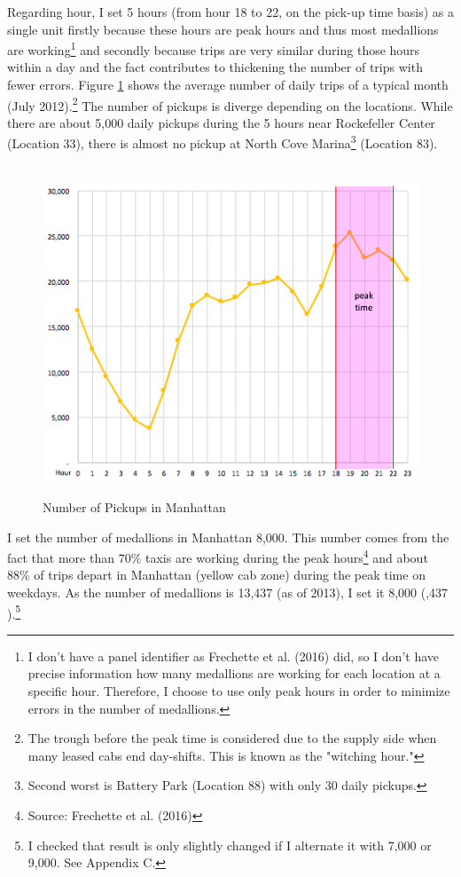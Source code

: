 \indent Regarding hour, I set 5 hours (from hour 18 to 22, on the pick-up time basis) as a single unit firstly because these hours are peak hours and thus most medallions are working\footnote{I don't have a panel identifier as Frechette et al. (2016) did, so I don't have precise information how many medallions are working for each location at a specific hour. Therefore, I choose to use only peak hours in order to minimize errors in the number of medallions.} and secondly because trips are very similar during those hours within a day and the fact contributes to thickening the number of trips with fewer errors. Figure \ref{fig:July_2012} shows the average number of daily trips of a typical month (July 2012).\footnote{The trough before the peak time is considered due to the supply side when many leased cabs end day-shifts. This is known as the "witching hour."} The number of pickups is diverge depending on the locations. While there are about 5,000 daily pickups during the 5 hours near Rockefeller Center (Location 33), there is almost no pickup at North Cove Marina\footnote{Second worst is Battery Park (Location 88) with only 30 daily pickups.} (Location 83).

\begin{figure}[h]
\centering
\caption{Number of Pickups in Manhattan}\label{fig:July_2012}\\
\vspace{0.2cm}
\includegraphics[width=12cm]{Figures/July_2012.png}
\end{figure}

\indent I set the number of medallions in Manhattan 8,000. This number comes from the fact that more than 70\% taxis are working during the peak hours\footnote{Source: Frechette et al. (2016)} and about 88\% of trips depart in Manhattan (yellow cab zone) during the peak time on weekdays. As the number of medallions is 13,437 (as of 2013), I set it 8,000 (,437  ).\footnote{I checked that result is only slightly changed if I alternate it with 7,000 or 9,000. See Appendix C.} 

